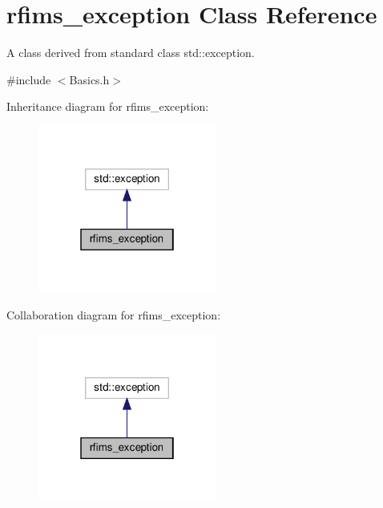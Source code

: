 \hypertarget{classrfims__exception}{}\section{rfims\+\_\+exception Class Reference}
\label{classrfims__exception}


A class derived from standard class {\ttfamily std\+::exception}.  




{\ttfamily \#include $<$Basics.\+h$>$}



Inheritance diagram for rfims\+\_\+exception\+:\nopagebreak
\begin{figure}[H]
\begin{center}
\leavevmode
\includegraphics[width=166pt]{classrfims__exception__inherit__graph}
\end{center}
\end{figure}


Collaboration diagram for rfims\+\_\+exception\+:\nopagebreak
\begin{figure}[H]
\begin{center}
\leavevmode
\includegraphics[width=166pt]{classrfims__exception__coll__graph}
\end{center}
\end{figure}
